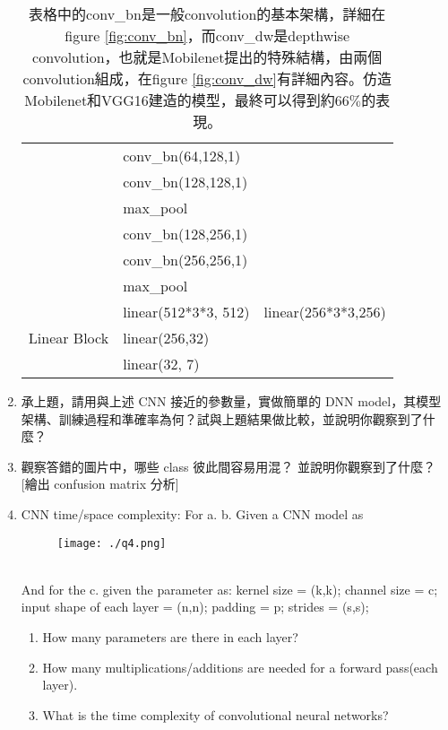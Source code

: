 \documentclass[12pt, a4paper]{article}
\begin{document}
\begin{enumerate}
\begin{table}[h]
\begin{tabular}{|c|l|l|}
    &conv\_bn(64,128,1)\\
    &conv\_bn(128,128,1)\\ 
    &max\_pool\\
    &conv\_bn(128,256,1)\\
    &conv\_bn(256,256,1)\\
    &max\_pool\\ \hline
    \multirow{3}{*}{Linear Block}&linear(512*3*3, 512)&linear(256*3*3,256)\\
    &linear(256,32)\\
    &linear(32, 7)\\ \hline
\end{tabular}
\caption{表格中的conv\_bn是一般convolution的基本架構，詳細在figure \ref{fig:conv_bn}，而conv\_dw是depthwise convolution，也就是Mobilenet提出的特殊結構，由兩個convolution組成，在figure \ref{fig:conv_dw}有詳細內容。仿造Mobilenet和VGG16建造的模型，最終可以得到約$66\%$的表現。}
\end{table}


\item 承上題，請用與上述 CNN 接近的參數量，實做簡單的 DNN model，其模型架構、訓練過程和準確率為何？試與上題結果做比較，並說明你觀察到了什麼？\\

\item 觀察答錯的圖片中，哪些 class 彼此間容易用混？ 並說明你觀察到了什麼？ [繪出 confusion matrix 分析]\\

\item CNN time/space complexity: For a. b. Given a CNN model as
\begin{figure}[ht]
    \centering
    \texttt{[image: ./q4.png]}
\end{figure}\\
And for the c. given the parameter as:
kernel size = (k,k);
channel size = c;
input shape of each layer = (n,n);
padding = p;
strides = (s,s);
\begin{enumerate}
    \item How many parameters are there in each layer?\\

    \item How many multiplications/additions are needed for a forward pass(each layer).\\
    
    \item What is the time complexity of convolutional neural networks?\\


\end{enumerate}
\end{enumerate}
\end{document}
